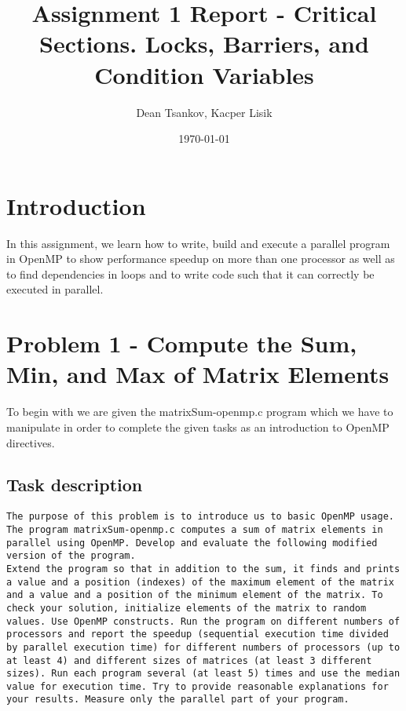\documentclass[a4paper,11pt]{article}
\begin{document}
\title{
    \textbf{Assignment 1 Report - Critical Sections. Locks, Barriers, and Condition Variables}
}
\author{Dean Tsankov, Kacper Lisik}
\date{\today}

\maketitle

\section*{Introduction}

In this assignment, we learn how to write, build and execute a parallel program in OpenMP to show performance speedup on more than one processor as well as to find dependencies in loops and to write code such that it can correctly be executed in parallel.

\section*{Problem 1 - Compute the Sum, Min, and Max of Matrix Elements}

To begin with we are given the matrixSum-openmp.c program which we have to manipulate in order to complete the given tasks as an introduction to OpenMP directives.

\subsection*{Task description}

\begin{verbatim}
The purpose of this problem is to introduce us to basic OpenMP usage. The program matrixSum-openmp.c computes a sum of matrix elements in parallel using OpenMP. Develop and evaluate the following modified version of the program.
Extend the program so that in addition to the sum, it finds and prints a value and a position (indexes) of the maximum element of the matrix and a value and a position of the minimum element of the matrix. To check your solution, initialize elements of the matrix to random values. Use OpenMP constructs. Run the program on different numbers of processors and report the speedup (sequential execution time divided by parallel execution time) for different numbers of processors (up to at least 4) and different sizes of matrices (at least 3 different sizes). Run each program several (at least 5) times and use the median value for execution time. Try to provide reasonable explanations for your results. Measure only the parallel part of your program.
\end{verbatim}
\end{document}
